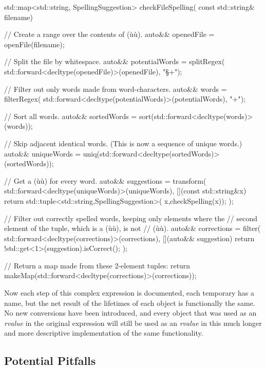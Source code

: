 \begin{emcppslisting}
std::map<std::string, SpellingSuggestion> checkFileSpelling(
                                                   const std::string& filename)
{
    // Create a range over the contents of (ù{}ù).
    auto&& openedFile = openFile(filename);

    // Split the file by whitespace.
    auto&& potentialWords = splitRegex(
        std::forward<decltype(openedFile)>(openedFile), "\S+");

    // Filter out only words made from word-characters.
    auto&& words = filterRegex(
        std::forward<decltype(potentialWords)>(potentialWords), "\w+");

    // Sort all words.
    auto&& sortedWords = sort(std::forward<decltype(words)>(words));

    // Skip adjacent identical words. (This is now a sequence of unique words.)
    auto&& uniqueWords = uniq(std::forward<decltype(sortedWords)>(sortedWords));

    // Get a (ù{}ù) for every word.
    auto&& suggestions = transform(
        std::forward<decltype(uniqueWords)>(uniqueWords),
        [](const std::string&x) {
            return std::tuple<std::string,SpellingSuggestion>(
                x,checkSpelling(x));
        });

    // Filter out correctly spelled words, keeping only elements where the
    // second element of the tuple, which is a (ù{}ù), is not
    // (ù{}ù).
    auto&& corrections = filter(
        std::forward<decltype(corrections)>(corrections),
        [](auto&& suggestion){ return !std::get<1>(suggestion).isCorrect(); });

    // Return a map made from these 2-element tuples:
    return makeMap(std::forward<decltype(corrections)>(corrections));
}
\end{emcppslisting}

\noindent Now each step of this complex expression is documented, each temporary
has a name, but the net result of the lifetimes of each object is
functionally the same. No new conversions have been introduced, and
every object that was used as an \emph{rvalue} in the original
expression will still be used as an \emph{rvalue} in this much longer
and more descriptive implementation of the same functionality.

\subsection[Potential Pitfalls]{Potential Pitfalls}\label{potential-pitfalls}

